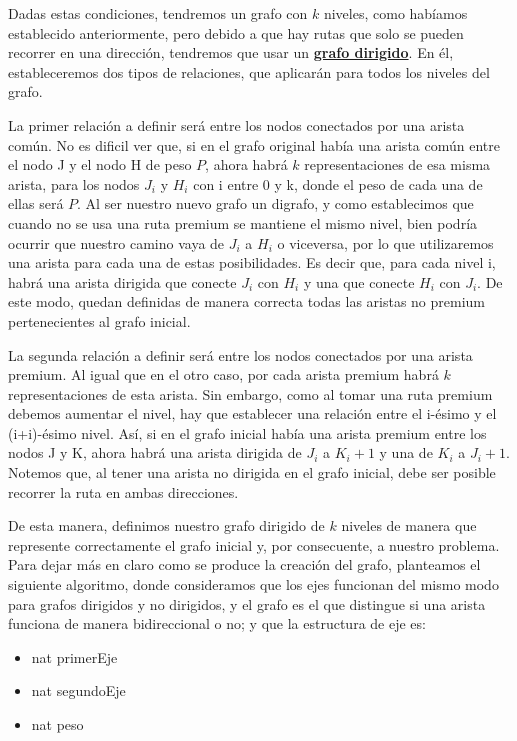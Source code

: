 Dadas estas condiciones, tendremos un grafo con $k$ niveles, como habíamos establecido anteriormente, pero debido a que hay rutas que solo se pueden recorrer en una dirección, tendremos que usar un \underline{\textbf{grafo dirigido}}. En él, estableceremos dos tipos de relaciones, que aplicarán para todos los niveles del grafo.
\\
\par
La primer relación a definir será entre los nodos conectados por una arista común. No es dificil ver que, si en el grafo original había una arista común entre el nodo J y el nodo H de peso $P$, ahora habrá $k$ representaciones de esa misma arista, para los nodos $J_i$ y $H_i$ con i entre 0 y k, donde el peso de cada una de ellas será $P$. Al ser nuestro nuevo grafo un digrafo, y como establecimos que cuando no se usa una ruta premium se mantiene el mismo nivel, bien podría ocurrir que nuestro camino vaya de $J_i$ a $H_i$ o viceversa, por lo que utilizaremos una arista para cada una de estas posibilidades. Es decir que, para cada nivel i, habrá una arista dirigida que conecte $J_i$ con $H_i$ y una que conecte $H_i$ con $J_i$. De este modo, quedan definidas de manera correcta todas las aristas no premium pertenecientes al grafo inicial.
\\
\par
La segunda relación a definir será entre los nodos conectados por una arista premium. Al igual que en el otro caso, por cada arista premium habrá $k$ representaciones de esta arista. Sin embargo, como al tomar una ruta premium debemos aumentar el nivel, hay que establecer una relación entre el i-ésimo y el (i+i)-ésimo nivel. Así, si en el grafo inicial había una arista premium entre los nodos J y K, ahora habrá una arista dirigida de $J_i$ a $K_i+1$ y una de $K_i$ a $J_i+1$. Notemos que, al tener una arista no dirigida en el grafo inicial, debe ser posible recorrer la ruta en ambas direcciones.
\\
\par
De esta manera, definimos nuestro grafo dirigido de $k$ niveles de manera que represente correctamente el grafo inicial y, por consecuente, a nuestro problema. Para dejar más en claro como se produce la creación del grafo, planteamos el siguiente algoritmo, donde consideramos que los ejes funcionan del mismo modo para grafos dirigidos y no dirigidos, y el grafo es el que distingue si una arista funciona de manera bidireccional o no; y que la estructura de eje es:
\begin{itemize}
\item nat primerEje
\item nat segundoEje
\item nat peso
\end{itemize}
